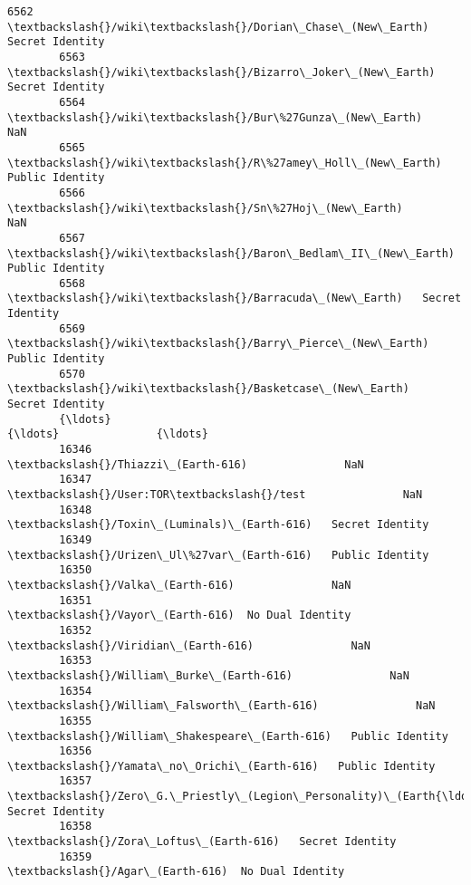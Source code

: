 \documentclass[11pt]{article}
\begin{document}
\begin{Verbatim}[commandchars=\\\{\}]
        6562                    \textbackslash{}/wiki\textbackslash{}/Dorian\_Chase\_(New\_Earth)   Secret Identity   
        6563                   \textbackslash{}/wiki\textbackslash{}/Bizarro\_Joker\_(New\_Earth)   Secret Identity   
        6564                     \textbackslash{}/wiki\textbackslash{}/Bur\%27Gunza\_(New\_Earth)               NaN   
        6565                   \textbackslash{}/wiki\textbackslash{}/R\%27amey\_Holl\_(New\_Earth)   Public Identity   
        6566                        \textbackslash{}/wiki\textbackslash{}/Sn\%27Hoj\_(New\_Earth)               NaN   
        6567                 \textbackslash{}/wiki\textbackslash{}/Baron\_Bedlam\_II\_(New\_Earth)   Public Identity   
        6568                       \textbackslash{}/wiki\textbackslash{}/Barracuda\_(New\_Earth)   Secret Identity   
        6569                    \textbackslash{}/wiki\textbackslash{}/Barry\_Pierce\_(New\_Earth)   Public Identity   
        6570                      \textbackslash{}/wiki\textbackslash{}/Basketcase\_(New\_Earth)   Secret Identity   
        {\ldots}                                                  {\ldots}               {\ldots}   
        16346                              \textbackslash{}/Thiazzi\_(Earth-616)               NaN   
        16347                                   \textbackslash{}/User:TOR\textbackslash{}/test               NaN   
        16348                     \textbackslash{}/Toxin\_(Luminals)\_(Earth-616)   Secret Identity   
        16349                      \textbackslash{}/Urizen\_Ul\%27var\_(Earth-616)   Public Identity   
        16350                                \textbackslash{}/Valka\_(Earth-616)               NaN   
        16351                                \textbackslash{}/Vayor\_(Earth-616)  No Dual Identity   
        16352                             \textbackslash{}/Viridian\_(Earth-616)               NaN   
        16353                        \textbackslash{}/William\_Burke\_(Earth-616)               NaN   
        16354                    \textbackslash{}/William\_Falsworth\_(Earth-616)               NaN   
        16355                  \textbackslash{}/William\_Shakespeare\_(Earth-616)   Public Identity   
        16356                     \textbackslash{}/Yamata\_no\_Orichi\_(Earth-616)   Public Identity   
        16357  \textbackslash{}/Zero\_G.\_Priestly\_(Legion\_Personality)\_(Earth{\ldots}   Secret Identity   
        16358                          \textbackslash{}/Zora\_Loftus\_(Earth-616)   Secret Identity   
        16359                                 \textbackslash{}/Agar\_(Earth-616)  No Dual Identity   

\end{Verbatim}
\end{document}
